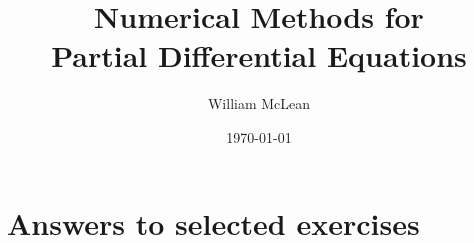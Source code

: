 \documentclass[12pt,a4paper]{book}
\title{Numerical Methods for \\
Partial Differential Equations}
\author{William McLean}
\date{\today}
\begin{document}
\maketitle
\tableofcontents
{}






\appendix

\chapter{Answers to selected exercises}
\end{document}
